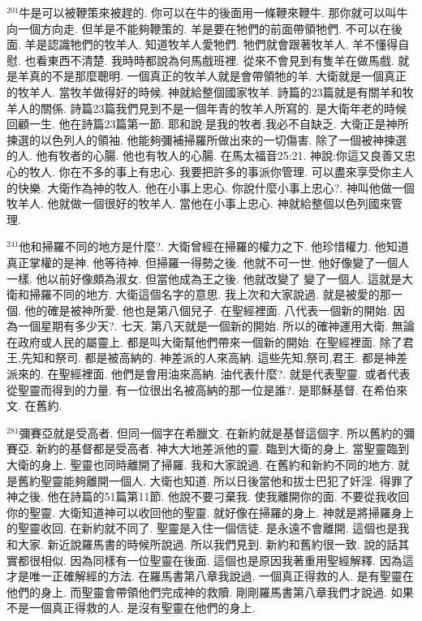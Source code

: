 \documentclass{book}
\begin{document}
$^{201}$牛是可以被鞭策來被趕的.
你可以在牛的後面用一條鞭來鞭牛.
那你就可以叫牛向一個方向走.
但羊是不能夠鞭策的.
羊是要在牠們的前面帶領牠們.
不可以在後面.
羊是認識牠們的牧羊人.
知道牧羊人愛牠們.
牠們就會跟著牧羊人.
羊不懂得自慰.
也看東西不清楚.
我時時都說為何馬戲班裡.
從來不會見到有隻羊在做馬戲.
就是羊真的不是那麼聰明.
一個真正的牧羊人就是會帶領牠的羊.
大衛就是一個真正的牧羊人.
當牧羊做得好的時候.
神就給整個國家牧羊.
詩篇的23篇就是有關羊和牧羊人的關係.
詩篇23篇我們見到不是一個年青的牧羊人所寫的.
是大衛年老的時候回顧一生.
他在詩篇23篇第一節.
耶和說:是我的牧者,我必不自缺乏.
大衛正是神所揀選的以色列人的領袖.
他能夠彌補掃羅所做出來的一切傷害.
除了一個被神揀選的人.
他有牧者的心腸.
他也有牧人的心腸.
在馬太福音25:21.
神說:你這又良善又忠心的牧人.
你在不多的事上有忠心.
我要把許多的事派你管理.
可以盡來享受你主人的快樂.
大衛作為神的牧人.
他在小事上忠心.
你說什麼小事上忠心?.
神叫他做一個牧羊人.
他就做一個很好的牧羊人.
當他在小事上忠心.
神就給整個以色列國來管理.

$^{241}$他和掃羅不同的地方是什麼?.
大衛曾經在掃羅的權力之下.
他珍惜權力.
他知道真正掌權的是神.
他等待神.
但掃羅一得勢之後.
他就不可一世.
他好像變了一個人一樣.
他以前好像頗為淑女.
但當他成為王之後.
他就改變了 變了一個人.
這就是大衛和掃羅不同的地方.
大衛這個名字的意思.
我上次和大家說過.
就是被愛的那一個.
他的確是被神所愛.
他也是第八個兒子.
在聖經裡面.
八代表一個新的開始.
因為一個星期有多少天?.
七天.
第八天就是一個新的開始.
所以的確神運用大衛.
無論在政府或人民的屬靈上.
都是叫大衛幫他們帶來一個新的開始.
在聖經裡面.
除了君王,先知和祭司.
都是被高納的.
神差派的人來高納.
這些先知,祭司,君王.
都是神差派來的.
在聖經裡面.
他們是會用油來高納.
油代表什麼?.
就是代表聖靈.
或者代表從聖靈而得到的力量.
有一位很出名被高納的那一位是誰?.
是耶穌基督.
在希伯來文.
在舊約.

$^{281}$彌賽亞就是受高者.
但同一個字在希臘文.
在新約就是基督這個字.
所以舊約的彌賽亞.
新約的基督都是受高者.
神大大地差派他的靈.
臨到大衛的身上.
當聖靈臨到大衛的身上.
聖靈也同時離開了掃羅.
我和大家說過.
在舊約和新約不同的地方.
就是舊約聖靈能夠離開一個人.
大衛也知道.
所以日後當他和拔士巴犯了奸淫.
得罪了神之後.
他在詩篇的51篇第11節.
他說不要刁棄我.
使我離開你的面.
不要從我收回你的聖靈.
大衛知道神可以收回他的聖靈.
就好像在掃羅的身上.
神就是將掃羅身上的聖靈收回.
在新約就不同了.
聖靈是入住一個信徒.
是永遠不會離開.
這個也是我和大家.
新近說羅馬書的時候所說過.
所以我們見到.
新約和舊約很一致.
說的話其實都很相似.
因為同樣有一位聖靈在後面.
這個也是原因我著重用聖經解釋.
因為這才是唯一正確解經的方法.
在羅馬書第八章我說過.
一個真正得救的人.
是有聖靈在他們的身上.
而聖靈會帶領他們完成神的救贖.
剛剛羅馬書第八章我們才說過.
如果不是一個真正得救的人.
是沒有聖靈在他們的身上.
\end{document}
